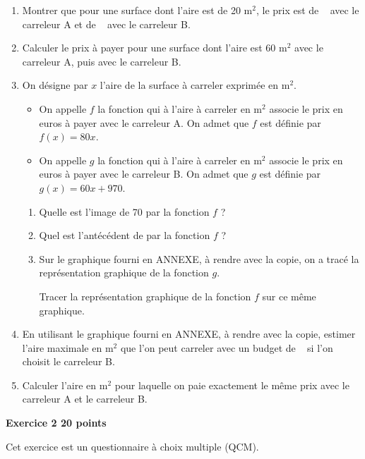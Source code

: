 \documentclass[11pt]{article}
\newcommand{\euro}{\eurologo{}}
\begin{document}
\begin{enumerate}
\item Montrer que pour une surface dont l’aire est de 20 m$^2$, le prix est de ~\euro{} avec le carreleur A et de ~\euro{} avec le carreleur B.
\item Calculer le prix à payer pour une surface dont l’aire est 60 m$^2$ avec le carreleur A, puis avec le carreleur B.
\item On désigne par $x$ l’aire de la surface à carreler exprimée en m$^2$.

\begin{itemize}[label=$\bullet~$]
\item On appelle $f$ la fonction qui à l’aire à carreler en m$^2$ associe le prix en euros à payer avec
le carreleur A. On admet que $f$ est définie par $f(x) = 80x$.
\item On appelle $g$ la fonction qui à l’aire à carreler en m$^2$ associe le prix en euros à payer avec
le carreleur B. On admet que $g$ est définie par $g(x) = 60x + 970$.
\end{itemize}

	\begin{enumerate}
		\item Quelle est l'image de 70 par la fonction $f$ ?
		\item Quel est l'antécédent de  par la fonction $f$ ?
		\item Sur le graphique fourni en ANNEXE, à rendre avec la copie, on a tracé la représentation graphique de la fonction $g$.

Tracer la représentation graphique de la fonction $f$ sur ce même graphique.
	\end{enumerate}
\item En utilisant le graphique fourni en ANNEXE, à rendre avec la copie, estimer l'aire maximale en m$^2$ que l'on peut carreler avec un budget de ~\euro{} si l'on choisit le carreleur B.
\item Calculer l’aire en m$^2$ pour laquelle on paie exactement le même prix avec le carreleur A et le carreleur B.
\end{enumerate}

\bigskip

\textbf{\large{}Exercice 2 \hfill 20 points}

\medskip

Cet exercice est un questionnaire à choix multiple (QCM).
\end{document}
